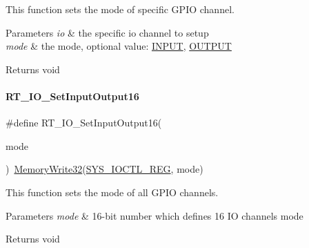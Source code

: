 This function sets the mode of specific G\+P\+IO channel. 


\begin{DoxyParams}{Parameters}
{\em io} & the specific io channel to setup \\
\hline
{\em mode} & the mode, optional value\+: \mbox{\hyperlink{a00014_a1bb283bd7893b9855e2f23013891fc82}{I\+N\+P\+UT}}, \mbox{\hyperlink{a00014_a61a3c9a18380aafb6e430e79bf596557}{O\+U\+T\+P\+UT}} \\
\hline
\end{DoxyParams}
\begin{DoxyReturn}{Returns}
void 
\end{DoxyReturn}
\mbox{\label{a00014_ade4bc867a36445fe0debc59cd5c9d9a5}} 
\paragraph{\texorpdfstring{R\+T\+\_\+\+I\+O\+\_\+\+Set\+Input\+Output16}{RT\_IO\_SetInputOutput16}}
{\footnotesize\ttfamily \#define R\+T\+\_\+\+I\+O\+\_\+\+Set\+Input\+Output16(\begin{DoxyParamCaption}\item[{}]{mode }\end{DoxyParamCaption})~\mbox{\hyperlink{a00020_a6b9732365b12e48ddb89fe1028b975b0}{Memory\+Write32}}(\mbox{\hyperlink{a00020_adadaa0ab1ebbd7ba9b70dfd24c3ed44da835280d31e2f3f5bc44bb1eb58024d80}{S\+Y\+S\+\_\+\+I\+O\+C\+T\+L\+\_\+\+R\+EG}}, mode)}



This function sets the mode of all G\+P\+IO channels. 


\begin{DoxyParams}{Parameters}
{\em mode} & 16-\/bit number which defines 16 IO channels\textquotesingle{} mode \\
\hline
\end{DoxyParams}
\begin{DoxyReturn}{Returns}
void 
\end{DoxyReturn}
\mbox{\label{a00014_a95fe40498ba314e1ea68aaa50335e7ef}} 
